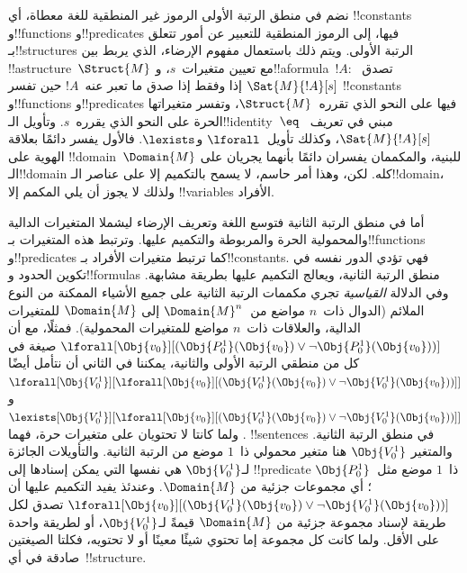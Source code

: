 \documentclass[../../../include/open-logic-section]{subfiles}
\begin{document}


نضم في منطق الرتبة الأولى الرموز غير المنطقية للغة معطاة، أي
!!{constant}s و!!{function}s و!!{predicate}s فيها، إلى الرموز المنطقية
للتعبير عن أمور تتعلق بـ!!{structure}s الرتبة الأولى. ويتم ذلك
باستعمال مفهوم الإرضاء، الذي يربط بين !!a{structure}~$\Struct{M}$ مع
تعيين متغيرات~$s$، و!!a{formula}~$!A$: تصدق~$\Sat{M}{!A}[s]$ إذا
وفقط إذا صدق ما تعبر عنه~$!A$ حين تفسر !!{constant}s و!!{function}s
و!!{predicate}s فيها على النحو الذي تقرره~$\Struct{M}$، وتفسر
متغيراتها الحرة على النحو الذي يقرره~$s$. وتأويل الـ!!{identity}~$\eq$
مبني في تعريف~$\Sat{M}{!A}[s]$، وكذلك تأويل~$\lforall$ و$\lexists$.
فالأول يفسر دائمًا بعلاقة الهوية على !!{domain}~$\Domain{M}$ للبنية،
والمكممان يفسران دائمًا بأنهما يجريان على الـ!!{domain} كله. لكن، وهذا
أمر حاسم، لا يسمح بالتكميم إلا على عناصر الـ!!{domain}، ولذلك لا يجوز
أن يلي المكمم إلا !!{variable}s الأفراد.

أما في منطق الرتبة الثانية فتوسع اللغة وتعريف الإرضاء ليشملا المتغيرات
الدالية والمحمولية الحرة والمربوطة والتكميم عليها. وترتبط هذه المتغيرات
بـ!!{function}s و!!{predicate}s كما ترتبط متغيرات الأفراد
بـ!!{constant}s. فهي تؤدي الدور نفسه في تكوين الحدود و!!{formula}s
منطق الرتبة الثانية، ويعالج التكميم عليها بطريقة مشابهة. وفي الدلالة
\emph{القياسية} تجري مكممات الرتبة الثانية على جميع الأشياء الممكنة من
النوع الملائم (الدوال ذات~$n$ مواضع من~$\Domain{M}^n$ إلى
$\Domain{M}$ للمتغيرات الدالية، والعلاقات ذات~$n$ مواضع للمتغيرات
المحمولية). فمثلًا، مع أن
$\lforall[\Obj{v_0}][(\Obj{P^1_0}(\Obj{v_0}) \lor \lnot
  \Obj{P^1_0}(\Obj{v_0}))]$ صيغة في كل من منطقي الرتبة الأولى والثانية،
يمكننا في الثاني أن نتأمل أيضًا
$\lforall[\Obj{V^1_0}][\lforall[\Obj{v_0}][(\Obj{V^1_0}(\Obj{v_0}) \lor
    \lnot \Obj{V^1_0}(\Obj{v_0}))]]$ و
$\lexists[\Obj{V^1_0}][\lforall[\Obj{v_0}][(\Obj{V^1_0}(\Obj{v_0}) \lor
    \lnot \Obj{V^1_0}(\Obj{v_0}))]]$. ولما كانتا لا تحتويان على
متغيرات حرة، فهما !!{sentence}s في منطق الرتبة الثانية. والمتغير
$\Obj{V^1_0}$ هنا متغير محمولي ذا~$1$ موضع من الرتبة الثانية.
والتأويلات الجائزة لـ$\Obj{V^1_0}$ هي نفسها التي يمكن إسنادها إلى
!!{predicate} ذا~$1$ موضع مثل~$\Obj{P^1_0}$؛ أي مجموعات جزئية من
$\Domain{M}$. وعندئذ يفيد التكميم عليها أن
$\lforall[\Obj{v_0}][(\Obj{V^1_0}(\Obj{v_0}) \lor \lnot
  \Obj{V^1_0}(\Obj{v_0}))]$ تصدق لكل طريقة لإسناد مجموعة جزئية من
$\Domain{M}$ قيمةً لـ$\Obj{V^1_0}$، أو لطريقة واحدة على الأقل. ولما
كانت كل مجموعة إما تحتوي شيئًا معينًا أو لا تحتويه، فكلتا الصيغتين
صادقة في أي~!!{structure}.
\end{document}
